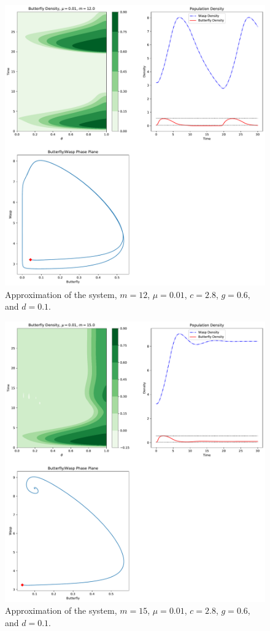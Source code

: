 \documentclass[12pt]{article}
\begin{document}
\begin{figure}[htb]
  \centering
  \includegraphics[width=12cm]{img/approximation-mu-01-m-12.pdf}
  \caption[Approximation with $m=12$ and $\mu=0.01$.]{Approximation of
    the system, $m=12$, $\mu=0.01$, $c=2.8$, $g=0.6$, and $d=0.1$. }
  \label{fig:approximationM12Mu01}
\end{figure}

\begin{figure}[htb]
  \centering
  \includegraphics[width=12cm]{img/approximation-mu-01-m-15.pdf}
  \caption[Approximation with $m=15$ and $\mu=0.01$.]{Approximation of
    the system, $m=15$, $\mu=0.01$, $c=2.8$, $g=0.6$, and $d=0.1$. }
  \label{fig:approximationM15Mu01}
\end{figure}
\end{document}
